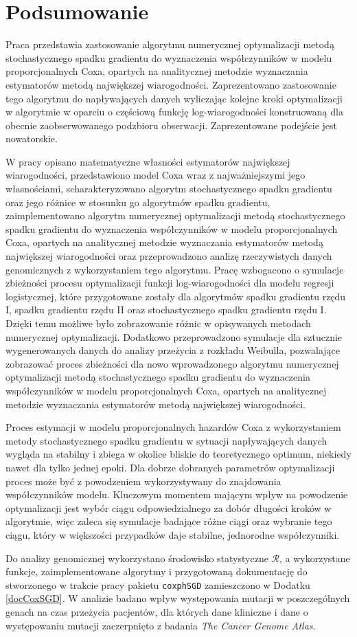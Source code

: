 \chapter*{Podsumowanie}
Praca przedstawia zastosowanie algorytmu numerycznej optymalizacji metodą stochastycznego spadku gradientu do wyznaczenia współczynników w modelu proporcjonalnych Coxa, opartych na analitycznej metodzie wyznaczania estymatorów metodą największej wiarogodności. Zaprezentowano zastosowanie tego algorytmu do napływających danych wyliczając kolejne kroki optymalizacji w algorytmie w oparciu o częściową funkcję log-wiarogodności konstruowaną dla obecnie zaobserwowanego podzbioru obserwacji. Zaprezentowane podejście jest nowatorskie.

W pracy opisano matematyczne własności estymatorów największej wiarogodności, przedstawiono model Coxa wraz z najważniejszymi jego własnościami, scharakteryzowano algorytm stochastycznego spadku gradientu oraz jego różnice w stosunku go algorytmów spadku gradientu, zaimplementowano algorytm numerycznej optymalizacji metodą stochastycznego spadku gradientu do wyznaczenia współczynników w modelu proporcjonalnych Coxa, opartych na analitycznej metodzie wyznaczania estymatorów metodą największej wiarogodności oraz przeprowadzono analizę rzeczywistych danych genomicznych z wykorzystaniem tego algorytmu. Pracę wzbogacono o symulacje zbieżności procesu optymalizacji funkcji log-wiarogodności dla modelu regresji logistycznej, które przygotowane zostały dla algorytmów spadku gradientu rzędu I, spadku gradientu rzędu II oraz stochastycznego spadku gradientu rzędu I. Dzięki temu możliwe było zobrazowanie różnic w opisywanych metodach numerycznej optymalizacji. Dodatkowo przeprowadzono symulacje dla sztucznie wygenerowanych danych do analizy przeżycia z rozkładu Weibulla, pozwalające zobrazować proces zbieżności dla nowo wprowadzonego algorytmu numerycznej optymalizacji metodą stochastycznego spadku gradientu do wyznaczenia współczynników w modelu proporcjonalnych Coxa, opartych na analitycznej metodzie wyznaczania estymatorów metodą największej wiarogodności.

Proces estymacji w modelu proporcjonalnych hazardów Coxa z wykorzystaniem metody stochastycznego spadku gradientu w sytuacji napływających danych wygląda na stabilny i zbiega w okolice bliskie do teoretycznego optimum, niekiedy nawet dla tylko jednej epoki. Dla dobrze dobranych parametrów optymalizacji proces może być z powodzeniem wykorzystywany do znajdowania współczynników modelu. Kluczowym momentem mającym wpływ na powodzenie optymalizacji jest wybór ciągu odpowiedzialnego za dobór długości kroków w algorytmie, więc zaleca się symulacje badające różne ciągi oraz wybranie tego ciągu, który w większości przypadków daje stabilne, jednorodne współczynniki. 

Do analizy genomicznej wykorzystano środowisko statystyczne $\mathcal{R}$, a wykorzystane funkcje, zaimplementowane algorytmy i przygotowaną dokumentację do stworzonego w trakcie pracy pakietu \texttt{coxphSGD} zamieszczono w Dodatku \ref{docCoxSGD}. W analizie badano wpływ występowania mutacji w poszczególnych genach na czas przeżycia pacjentów, dla których dane kliniczne i dane o występowaniu mutacji zaczerpnięto z badania \textit{The Cancer Genome Atlas}.
